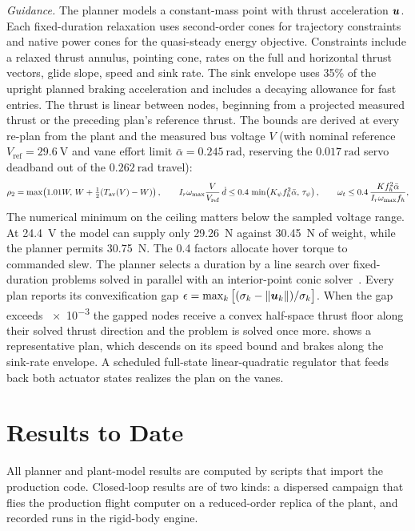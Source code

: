\documentclass[10pt,letterpaper]{article}
\begin{document}
\textit{Guidance.}
The planner models a constant-mass point with thrust acceleration $\bm{u}$. Each fixed-duration relaxation uses second-order cones for trajectory constraints and native power cones for the quasi-steady energy objective.
Constraints include a relaxed thrust annulus, pointing cone, rates on the full and horizontal thrust vectors, glide slope, speed and sink rate. The sink envelope uses 35\% of the upright planned braking acceleration and includes a decaying allowance for fast entries.
The thrust is linear between nodes, beginning from a projected measured thrust or the preceding plan's reference thrust.
The bounds are derived at every re-plan from the plant and the measured bus voltage $V$ (with nominal reference $V_{\text{ref}} = \SI{29.6}{\volt}$ and vane effort limit $\bar\alpha = \SI{0.245}{\radian}$, reserving the $\SI{0.017}{\radian}$ servo deadband out of the $\SI{0.262}{\radian}$ travel):
\begin{equation}
\rho_2 = \max\!\left(1.01W,\,W+\tfrac12(T_{\text{av}}(V)-W)\right), \qquad
I_r\omega_{\max}\frac{V}{V_{\text{ref}}}\,\dot d \le 0.4\,\min\!\left(K_\psi f_h^2\bar\alpha,\, \tau_\psi\right), \qquad
\omega_t \le 0.4\,\frac{K f_h^2\bar\alpha}{I_r\omega_{\max} f_h} ,
\end{equation}
The numerical minimum on the ceiling matters below the sampled voltage range. At \SI{24.4}{\volt} the model can supply only \SI{29.26}{\newton} against \SI{30.45}{\newton} of weight, while the planner permits \SI{30.75}{\newton}. The 0.4 factors allocate hover torque to commanded slew.
The planner selects a duration by a line search over fixed-duration problems solved in parallel with an interior-point conic solver~\cite{goulart2024clarabel}.
Every plan reports its convexification gap $\epsilon = \max_k\big[(\sigma_k - \|\bm{u}_k\|)/\sigma_k\big]$.
When the gap exceeds \num{e-3} the gapped nodes receive a convex half-space thrust floor along their solved thrust direction and the problem is solved once more.
 shows a representative plan, which descends on its speed bound and brakes along the sink-rate envelope.
A scheduled full-state linear-quadratic regulator that feeds back both actuator states realizes the plan on the vanes.

\section{Results to Date}

All planner and plant-model results are computed by scripts that import the production code. Closed-loop results are of two kinds: a dispersed campaign that flies the production flight computer on a reduced-order replica of the plant, and recorded runs in the rigid-body engine.
\end{document}
